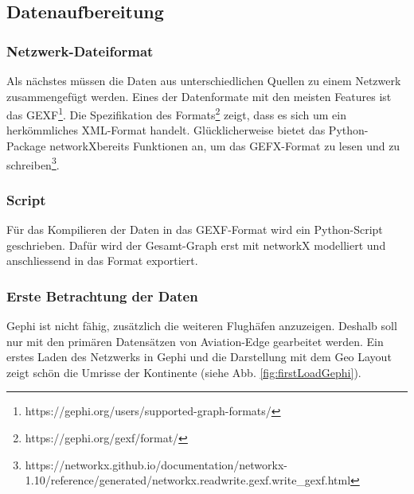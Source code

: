 \subsection{Datenaufbereitung}
\label{subsec:dataCleancing}

\subsubsection{Netzwerk-Dateiformat}
\label{subsec:networkFileformat}
Als nächstes müssen die Daten aus unterschiedlichen Quellen zu einem Netzwerk zusammengefügt werden.
Eines der Datenformate mit den meisten Features ist das GEXF\footnote{https://gephi.org/users/supported-graph-formats/}.
Die Spezifikation des Formats\footnote{https://gephi.org/gexf/format/} zeigt, dass es sich um ein herkömmliches XML-Format handelt.
Glücklicherweise bietet das Python-Package \guillemotleft networkX\guillemotright bereits Funktionen an, um das
GEFX-Format zu lesen und zu schreiben\footnote{https://networkx.github.io/documentation/networkx-1.10/reference/generated/networkx.readwrite.gexf.write\_gexf.html}.


\subsubsection{Script}
Für das Kompilieren der Daten in das GEXF-Format wird ein Python-Script geschrieben.
Dafür wird der Gesamt-Graph erst mit networkX modelliert und anschliessend in das Format exportiert.


    

\subsubsection{Erste Betrachtung der Daten}
Gephi ist nicht fähig, zusätzlich die weiteren Flughäfen anzuzeigen.
Deshalb soll nur mit den primären Datensätzen von Aviation-Edge gearbeitet werden.
Ein erstes Laden des Netzwerks in Gephi und die Darstellung mit dem \guillemotleft Geo Layout \guillemotright zeigt
schön die Umrisse der Kontinente (siehe Abb. \ref{fig:firstLoadGephi}).

